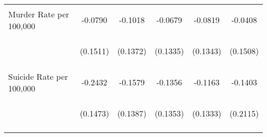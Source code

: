 \begin{center}
\begin{tabular}{lccccc}
\noalign{\smallskip}Murder Rate per 100,000 & \begin{scriptsize}-0.0790\end{scriptsize} & \begin{scriptsize}-0.1018\end{scriptsize} & \begin{scriptsize}-0.0679\end{scriptsize} & \begin{scriptsize}-0.0819\end{scriptsize} & \begin{scriptsize}-0.0408\end{scriptsize}\\
 & \begin{scriptsize}(0.1511)\end{scriptsize} & \begin{scriptsize}(0.1372)\end{scriptsize} & \begin{scriptsize}(0.1335)\end{scriptsize} & \begin{scriptsize}(0.1343)\end{scriptsize} & \begin{scriptsize}(0.1508)\end{scriptsize}\\
\noalign{\smallskip}Suicide Rate per 100,000 & \begin{scriptsize}-0.2432\end{scriptsize} & \begin{scriptsize}-0.1579\end{scriptsize} & \begin{scriptsize}-0.1356\end{scriptsize} & \begin{scriptsize}-0.1163\end{scriptsize} & \begin{scriptsize}-0.1403\end{scriptsize}\\
 & \begin{scriptsize}(0.1473)\end{scriptsize} & \begin{scriptsize}(0.1387)\end{scriptsize} & \begin{scriptsize}(0.1353)\end{scriptsize} & \begin{scriptsize}(0.1333)\end{scriptsize} & \begin{scriptsize}(0.2115)\end{scriptsize}\\
\noalign{\smallskip}\hline\end{tabular}\\
\end{center}
